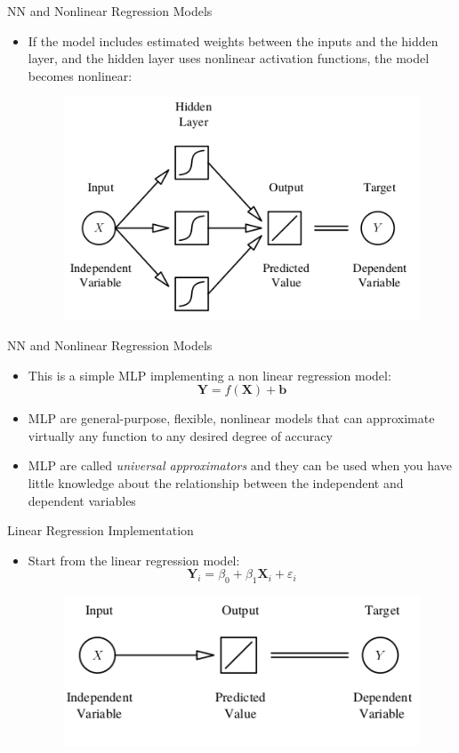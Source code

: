 \documentclass[xcolor ={table,usenames,dvipsnames}]{beamer}
\theoremstyle{definition}
\begin{document}
\begin{frame}{NN and Nonlinear Regression Models}
\begin{itemize}
	\item 
	If the model includes estimated weights between the inputs and the hidden layer, and the hidden layer uses nonlinear activation functions, the model becomes nonlinear:
	\begin{figure}[h!]
		\centering
		\includegraphics[scale=2]{../Relazione/img/nonlinreg}
	\end{figure}
\end{itemize}
\end{frame}
\begin{frame}{NN and Nonlinear Regression Models}
\begin{itemize}
	\item This is a simple MLP implementing a non linear regression model:
	$$
	\textbf{Y} = f(\textbf{X}) + \textbf{b}
	$$
	\item MLP are general-purpose, flexible, nonlinear models that can approximate
	virtually any function to any desired degree of accuracy
	\item MLP are called \emph{universal approximators} and they can be used when you have little knowledge about the relationship between the independent and dependent variables
\end{itemize}
\end{frame}
\begin{frame}{Linear Regression Implementation}
\begin{itemize}
	\item Start from the linear regression model:
	$$
	\textbf{Y}_i = \beta_0 + \beta_1 \textbf{X}_i + \varepsilon_i
	$$
	\begin{figure}[h!]
		\centering
		\includegraphics[scale=2]{../Relazione/img/linreg}
	\end{figure}
\end{itemize}
\end{frame}
\end{document}
